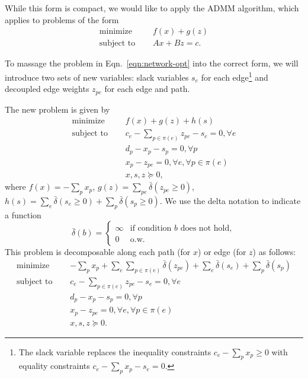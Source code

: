 \documentclass[11pt]{article}
\begin{document}
While this form is compact, we would like to apply the ADMM algorithm,
which applies to problems of the form
\begin{equation}
\label{eqn:admm}
\begin{aligned}
\textrm{minimize } \quad & f(x) + g(z)\\
\textrm{subject to } \quad & Ax + Bz = c.
\end{aligned}
\end{equation}

To massage the problem in Eqn.~\ref{eqn:network-opt} into the correct form,
we will introduce two sets of new variables: slack variables $s_e$ for each edge\footnote{
The slack variable replaces the inequality constraints $c_e - \sum_p x_p \ge 0$
with equality constraints $c_e - \sum_p x_p - s_e = 0$.
}
and decoupled edge weights $z_{pe}$ for each edge and path.

The new problem is given by
\begin{equation}
\label{eqn:network-opt-std}
\begin{aligned}
\textrm{minimize } \quad & f(x) + g(z) + h(s)\\
\textrm{subject to } \quad &c_e - \sum_{p\in\pi(e)}z_{pe} - s_{e} = 0, \forall e\\
& d_p - x_p - s_p = 0, \forall p\\
&x_p - z_{pe} = 0, \forall e, \forall p \in \pi(e)\\
&x,s,z \succeq 0,
\end{aligned}
\end{equation}
where $f(x) = -\sum_p x_p$,
$g(z) = \sum_{pe} \bar\delta(z_{pe} \ge 0)$,
$h(s) = \sum_{e} \bar\delta(s_{e} \ge 0)+ \sum_{p} \bar\delta(s_{p} \ge 0) $.
We use the delta notation to indicate a function
$$
\bar\delta(b) = \begin{cases}
    \infty & \textrm{if condition } b \textrm{ does not hold},\\
    0 & \textrm{o.w.}
\end{cases}
$$
This problem is decomposable along each path (for $x$) or edge (for $z$) as follows:
\begin{equation}
\label{eqn:network-opt-sep}
\begin{aligned}
\textrm{minimize } \quad & -\sum_p x_p
    + \sum_e\sum_{p \in \pi(e)} \bar\delta(z_{pe})
    + \sum_e \bar\delta(s_{e}) + \sum_p \bar\delta(s_p)\\
\textrm{subject to } \quad &c_e - \sum_{p\in\pi(e)}z_{pe} - s_{e} = 0, \forall e\\
& d_p - x_p - s_p = 0, \forall p\\
&x_p - z_{pe} = 0, \forall e, \forall p \in \pi(e)\\
&x,s,z \succeq 0.
\end{aligned}
\end{equation}
\end{document}
